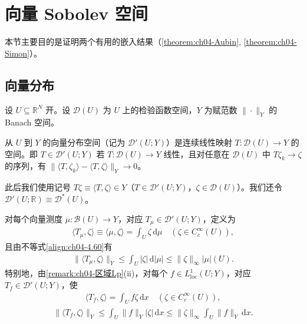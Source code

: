 \documentclass[../../main.tex]{subfiles}%
\begin{document}
\section{向量 Sobolev 空间}\label{section:ch04-向量Sobolev}

本节主要目的是证明两个有用的嵌入结果（\cref{theorem:ch04-Aubin}, \cref{theorem:ch04-Simon}）。

\subsection{向量分布}\label{subsection:ch04-向量分布}

设 $U\subseteq\mathbb{R}^N$ 开。设 $\mathcal{D}(U)$ 为 $U$ 上的检验函数空间，$Y$ 为赋范数 $\|\cdot\|_Y$ 的 Banach 空间。

\begin{definition}[向量分布]\label{definition:ch04-向量分布}
从 $U$ 到 $Y$ 的向量分布空间（记为 $\mathcal{D}'(U;Y)$）是连续线性映射 $T:\mathcal{D}(U)\to Y$ 的空间。即 $T\in\mathcal{D}'(U;Y)$ 若 $T:\mathcal{D}(U)\to Y$ 线性，且对任意在 $\mathcal{D}(U)$ 中 $T\zeta_k\to\zeta$ 的序列，有 $\|\langle T,\zeta_k\rangle-\langle T,\zeta\rangle\|_Y\to0$。
\end{definition}

此后我们使用记号 $T\zeta\equiv\langle T,\zeta\rangle\in Y$（$T\in\mathcal{D}'(U;Y)$，$\zeta\in\mathcal{D}(U)$）。我们还令 $\mathcal{D}'(U;\mathbb{R})\equiv\mathcal{D}^*(U)$。

\begin{remark}\label{remark:ch04-向量分布例子}
对每个向量测度 $\mu:\mathcal{B}(U)\to Y$，对应 $T_\mu\in\mathcal{D}'(U;Y)$，定义为
\begin{align*}
\langle T_\mu,\zeta\rangle\equiv\langle\mu,\zeta\rangle=\int_U\zeta\,\mathrm{d}\mu\quad(\zeta\in C_c^\infty(U)),
\end{align*}
且由不等式\eqref{align:ch04-4.60}有
\begin{align*}
\|\langle T_\mu,\zeta\rangle\|_Y\leqslant\int_U|\zeta|\,\mathrm{d}|\mu|\leqslant\|\zeta\|_\infty|\mu|(U).
\end{align*}
特别地，由\cref{remark:ch04-区域Lp}(ii)，对每个 $f\in L^1_{\mathrm{loc}}(U;Y)$，对应 $T_f\in\mathcal{D}'(U;Y)$，使
\begin{align*}
\langle T_f,\zeta\rangle=\int_U f\zeta\,\mathrm{d}x\quad(\zeta\in C_c^\infty(U)),
\end{align*}
\begin{align*}
\|\langle T_f,\zeta\rangle\|_Y\leqslant\int_U\|f\|_Y|\zeta|\,\mathrm{d}x\leqslant\|\zeta\|_\infty\int_U\|f\|_Y\,\mathrm{d}x.
\end{align*}
\end{remark}
\end{document}
